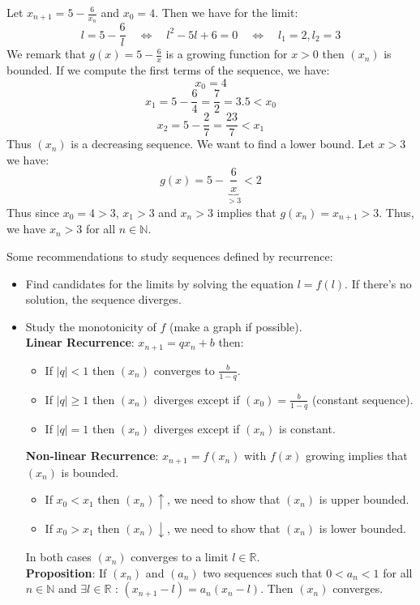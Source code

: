 \begin{eg}
    Let $x_{n + 1} = 5 - \frac{6}{x_n}$ and $x_0 = 4$. Then we have for the limit:
    \[
        l = 5 - \frac{6}{l} \quad \Leftrightarrow \quad l^2 - 5l + 6 = 0 \quad \Leftrightarrow \quad l_1 = 2, l_2 = 3
    \]
    We remark that $g(x) = 5 - \frac{6}{x}$ is a growing function for $x > 0$ then $(x_n)$ is bounded. If we compute the first terms of the sequence, we have:
    \[ x_0 = 4 \]
    \[ x_1 = 5 - \frac{6}{4} = \frac{7}{2} = 3.5 < x_0 \]
    \[ x_2 = 5 - \frac{2}{7} = \frac{23}{7} < x_1 \]
    Thus $(x_n)$ is a decreasing sequence. We want to find a lower bound. Let $x > 3$ we have:
    \[ g(x) = 5 - \underbrace{\frac{6}{x}}_{> 3} < 2 \]
    Thus since $x_0 = 4 > 3$, $x_1 > 3$ and $x_n > 3$ implies that $g(x_n) = x_{n + 1} > 3$. Thus, we have $x_n > 3$ for all $n \in \mathbb{N}$. 
\end{eg}
Some recommendations to study sequences defined by recurrence:
\begin{itemize}[itemsep=1pt,label=$\circ$]
    \item Find candidates for the limits by solving the equation $l = f(l)$. If there's no solution, the sequence diverges.
    \item Study the monotonicity of $f$ (make a graph if possible). \\
    \textbf{Linear Recurrence}: $x_{n + 1} = qx_n + b$ then:
    \begin{itemize}[itemsep=1pt]
        \item If $|q| < 1$ then $(x_n)$ converges to $\frac{b}{1 - q}$.
        \item If $|q| \geq 1$ then $(x_n)$ diverges except if $(x_0) = \frac{b}{1 - q}$ (constant sequence).
        \item If $|q| = 1$ then $(x_n)$ diverges except if $(x_n)$ is constant.
    \end{itemize}
    \textbf{Non-linear Recurrence}: $x_{n + 1} = f(x_n)$ with $f(x)$ growing implies that $(x_n)$ is bounded.
    \begin{itemize}
        \item If $x_0 < x_1$ then $(x_n) \uparrow$, we need to show that $(x_n)$ is upper bounded.
        \item If $x_0 > x_1$ then $(x_n) \downarrow$, we need to show that $(x_n)$ is lower bounded.
    \end{itemize}
    In both cases $(x_n)$ converges to a limit $l \in \mathbb{R}$. \\
    \textbf{Proposition}: If $(x_n)$ and $(a_n)$ two sequences such that $0 < a_n < 1$ for all $n \in \mathbb{N}$ and $\exists l \in \mathbb{R}$ : $(x_{n + 1} - l) = a_n (x_n - l)$. Then $(x_n)$ converges.
\end{itemize}

